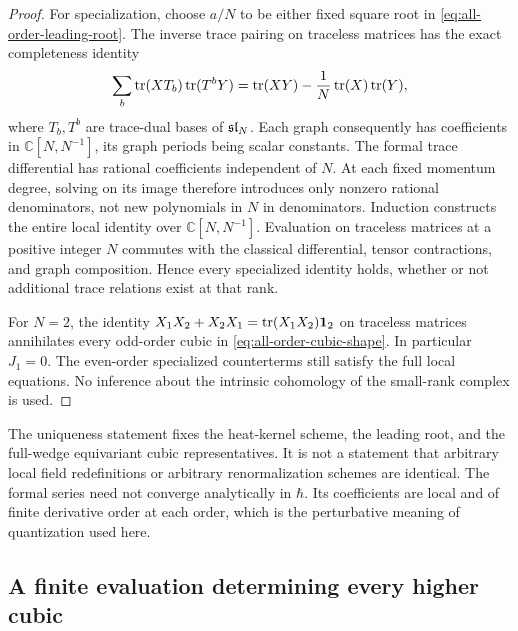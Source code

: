 \begin{proof}
For specialization, choose $a/N$ to be either fixed square root in
\eqref{eq:all-order-leading-root}.  The inverse trace pairing on
traceless matrices has the exact completeness identity
\begin{equation}
 \sum_b\operatorname{tr}(XT_b)\operatorname{tr}(T^bY)
   =\operatorname{tr}(XY)-\frac1N\operatorname{tr}(X)\operatorname{tr}(Y),
 \label{eq:all-order-completeness}
\end{equation}
where $T_b,T^b$ are trace-dual bases of $\mathfrak{sl}_N$.
Each graph consequently has coefficients in
$\mathbb C[N,N^{-1}]$, its graph periods being scalar constants.
The formal trace differential has rational coefficients independent
of $N$.  At each fixed momentum degree, solving on its image
therefore introduces only nonzero rational denominators, not new
polynomials in $N$ in denominators.  Induction constructs the
entire local identity over $\mathbb C[N,N^{-1}]$.
Evaluation on traceless matrices at a positive integer $N$ commutes
with the classical differential, tensor contractions, and graph
composition.  Hence every specialized identity holds, whether or
not additional trace relations exist at that rank.

For $N=2$, the identity
$X_1X_2+X_2X_1=\operatorname{tr}(X_1X_2)\mathbf1_2$ on traceless matrices
annihilates every odd-order cubic in
\eqref{eq:all-order-cubic-shape}.  In particular $J_1=0$.
The even-order specialized counterterms still satisfy the full
local equations.  No inference about the intrinsic cohomology
of the small-rank complex is used.
\end{proof}

\begin{remark}
The uniqueness statement fixes the heat-kernel scheme, the leading
root, and the full-wedge equivariant cubic representatives.  It is
not a statement that arbitrary local field redefinitions or arbitrary
renormalization schemes are identical.  The formal series need not
converge analytically in $\hbar$.  Its coefficients are local and of
finite derivative order at each order, which is the perturbative
meaning of quantization used here.
\end{remark}

\subsection{A finite evaluation determining every higher cubic}

